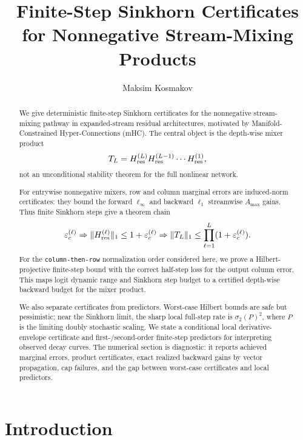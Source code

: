 \documentclass[11pt]{article}
\title{Finite-Step Sinkhorn Certificates for Nonnegative Stream-Mixing Products}
\author{Maksim Kosmakov}
\date{}
\numberwithin{equation}{section}
\theoremstyle{plain}
\theoremstyle{definition}
\theoremstyle{remark}
\begin{document}
\maketitle
 
\begin{abstract}
We give deterministic finite-step Sinkhorn certificates for the nonnegative
stream-mixing pathway in expanded-stream residual architectures, motivated by
Manifold-Constrained Hyper-Connections (mHC).  The central object is the
depth-wise mixer product
\[
        T_L=H_{\rm res}^{(L)}H_{\rm res}^{(L-1)}\cdots H_{\rm res}^{(1)} ,
\]
not an unconditional stability theorem for the full nonlinear network.

For entrywise nonnegative mixers, row and column marginal errors are induced-norm
certificates: they bound the forward $\ell_\infty$ and backward $\ell_1$
streamwise \(A_{\max}\) gains.  Thus finite Sinkhorn steps give a theorem chain
\[
    \varepsilon_c^{(\ell)}
    \Rightarrow
    \|H_{\rm res}^{(\ell)}\|_1\le 1+\varepsilon_c^{(\ell)}
    \Rightarrow
    \|T_L\|_1\le \prod_{\ell=1}^L(1+\varepsilon_c^{(\ell)}).
\]
For the \texttt{column-then-row} normalization order considered here, we prove a
Hilbert-projective finite-step bound with the correct half-step loss for the
output column error.  This maps logit dynamic range and Sinkhorn step budget to
a certified depth-wise backward budget for the mixer product.

We also separate certificates from predictors.  Worst-case Hilbert bounds are
safe but pessimistic; near the Sinkhorn limit, the sharp local full-step rate is
\(\sigma_2(P)^2\), where \(P\) is the limiting doubly stochastic scaling.  We
state a conditional local derivative-envelope certificate and first-/second-order
finite-step predictors for interpreting observed decay curves.  The numerical
section is diagnostic: it reports achieved marginal errors, product certificates,
exact realized backward gains by vector propagation, cap failures, and the gap
between worst-case certificates and local predictors.
\end{abstract}












\section{Introduction}\label{sec:intro}
\end{document}
